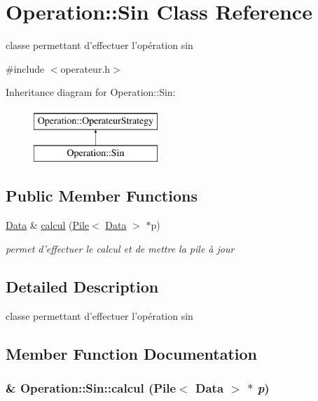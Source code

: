 \hypertarget{classOperation_1_1Sin}{
\section{Operation::Sin Class Reference}
\label{classOperation_1_1Sin}
}


classe permettant d'effectuer l'opération sin  




{\ttfamily \#include $<$operateur.h$>$}

Inheritance diagram for Operation::Sin:\begin{figure}[H]
\begin{center}
\leavevmode
\includegraphics[height=2cm]{classOperation_1_1Sin}
\end{center}
\end{figure}
\subsection*{Public Member Functions}
\begin{DoxyCompactItemize}
\item 
\hyperlink{classNombre_1_1Data}{Data} \& \hyperlink{classOperation_1_1Sin_a022b0f8b71068fa9bfd40a0c4f4c3fcd}{calcul} (\hyperlink{classPile}{Pile}$<$ \hyperlink{classNombre_1_1Data}{Data} $>$ $\ast$p)
\begin{DoxyCompactList}\small\item\em permet d'effectuer le calcul et de mettre la pile à jour \item\end{DoxyCompactList}\end{DoxyCompactItemize}


\subsection{Detailed Description}
classe permettant d'effectuer l'opération sin 

\subsection{Member Function Documentation}
\hypertarget{classOperation_1_1Sin_a022b0f8b71068fa9bfd40a0c4f4c3fcd}{
\subsubsection[{calcul}]{\& Operation::Sin::calcul ({\bf Pile}$<$ {\bf Data} $>$ $\ast$ {\em p})}}
\label{classOperation_1_1Sin_a022b0f8b71068fa9bfd40a0c4f4c3fcd}


